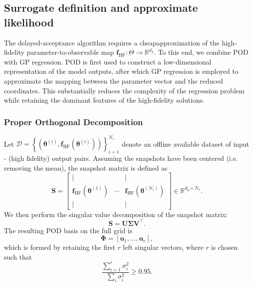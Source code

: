 \documentclass{elsarticle}
\begin{document}
\subsection{Surrogate definition and approximate likelihood}
The delayed-acceptance algorithm requires a cheapapproximation of the high-fidelity parameter-to-observable map $\mathbf{f}_{\mathrm{HF}}:\Theta\rightarrow\mathbb{R}^{d_y}$.
To this end, we combine POD with GP regression. POD is first used to construct a low-dimensional representation of the model outputs, after which GP regression is employed to approximate the mapping between the parameter vector and the reduced coordinates. This substantially reduces the complexity of the regression problem while retaining the dominant features of the high-fidelity solutions.
\subsubsection{Proper Orthogonal Decomposition}

Let $
\mathcal D
=
\left\{
\left(
\boldsymbol{\theta}^{(i)},
\mathbf f_{\mathrm{HF}}(\boldsymbol{\theta}^{(i)})
\right)
\right\}_{i=1}^{N_s} $
denote an offline available dataset of input - (high fidelity) output pairs. Assuming the snapshots have been centered (i.e. removing the mean), the snapshot matrix is defined as
\begin{equation}
\mathbf{S}
=
\left[
\begin{array}{ccc}
| & & | \\
\mathbf{f}_{\mathrm{HF}}\!\left(\boldsymbol{\theta}^{(1)}\right)
& \cdots &
\mathbf{f}_{\mathrm{HF}}\!\left(\boldsymbol{\theta}^{(N_s)}\right)\\
| & & |
\end{array}
\right]
\in \mathbb{R}^{d_y \times N_s}.
\end{equation}
We then perform the singular value decomposition of the snapshot matrix:
\begin{equation}
\mathbf S
=
\mathbf U
\boldsymbol{\Sigma}
\mathbf V^{\top}.
\end{equation}
The resulting POD basis on the full grid is
\begin{equation}
\mathbf\Phi
=
[\mathbf u_1,\ldots,\mathbf u_r],
\end{equation}
which is formed by retaining the first \(r\) left singular vectors, where \(r\) is chosen such that
\begin{equation}
\frac{\sum_{i=1}^{r}\sigma_i^2}
{\sum_i\sigma_i^2}
\geq
0.95.
\end{equation}
\end{document}
